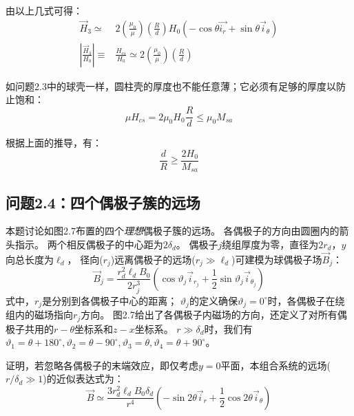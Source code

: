由以上几式可得：
\begin{align}
\vec{H}_3 \simeq& 2\left(\frac{\mu_0}{\mu}\right) \left(\frac{R}{d}\right)H_0 (-\cos\theta \vec{i_r}+\sin\theta\vec{i}_\theta)\nonumber\\
\left|\frac{\vec{H}_3}{H_0}\right|\equiv&\frac{H_{cs}}{H_0}\simeq 2\left(\frac{\mu_0}{\mu}\right) \left(\frac{R}{d}\right)
\end{align}

如问题2.3中的球壳一样，圆柱壳的厚度也不能任意薄；它必须有足够的厚度以防止饱和：
$$\mu H_{cs}=2\mu_0 H_0 \frac{R}{d}\le \mu_0 M_{sa}$$

根据上面的推导，有：
\begin{equation}
\frac{d}{R}\ge \frac{2H_0}{M_{sa}}
\end{equation}


\subsection{问题2.4：四个偶极子簇的远场}
本题讨论如图2.7布置的四个\textit{理想}偶极子簇的远场。
各偶极子的方向由圆圈内的箭头指示。
两个相反偶极子的中心距为$2\delta_d$。
偶极子$j$绕组厚度为零，直径为$2r_d$，$y$向总长度为$\ell_d$，
径向($r_j$)远离偶极子的远场($r_j \gg \ell_d$)可建模为球偶极子场$\vec{B}_j$：
\begin{equation}
\vec{B}_j=\frac{r_d^2 \ell_d B_0}{2r_j^3}(\cos\vartheta_j \vec{i}_{r_j}+\frac{1}{2} \sin\vartheta_j \vec{i}_{\theta_j})
\end{equation}
式中，$r_j$是分别到各偶极子中心的距离；
$\vartheta_j$的定义确保$\vartheta_j=0^\circ$时，各偶极子在绕组内的磁场指向$r_j$方向。
图2.7给出了各偶极子内磁场的方向，还定义了对所有偶极子共用的$r-\theta$坐标系和$z-x$坐标系。
$r\gg \delta_d$时，我们有${\vartheta}_1=\theta+180^\circ,\vartheta_2=\theta-90^\circ,\vartheta_3=\theta,\vartheta_4=\theta + 90^\circ$。

证明，若忽略各偶极子的末端效应，即仅考虑$y=0$平面，本组合系统的远场($r/\delta_d \gg 1$)的近似表达式为：
\begin{equation}
\vec{B}\simeq \frac{3r_d^2 \ell_d B_0 \delta_d}{r^4}(-\sin 2\theta \vec{i}_r+\frac{1}{2}\cos 2\theta \vec{i}_\theta)
\end{equation}

